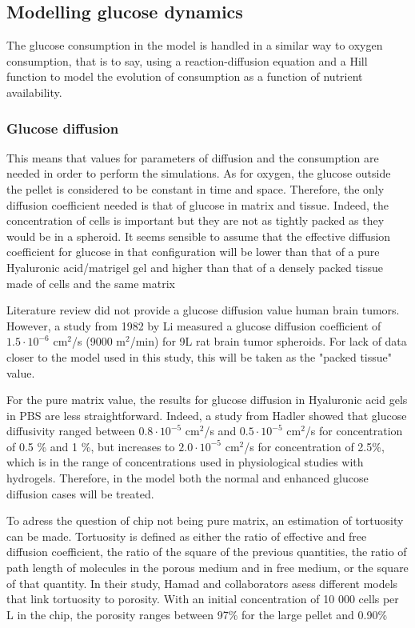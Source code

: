 \documentclass[11pt,a4paper]{article}
\begin{document}
\subsection{Modelling glucose dynamics}
The glucose consumption in the model is handled in a similar way to oxygen consumption, that is to say, using a reaction-diffusion equation and a Hill  function to model the evolution of consumption as a function of nutrient availability.

\subsubsection{Glucose diffusion}
This means that values for parameters of diffusion and the consumption are needed in order to perform the simulations. As for oxygen, the glucose outside the pellet is considered to be constant in time and space. Therefore, the only diffusion coefficient needed is that of glucose in matrix and tissue. Indeed, the concentration of cells is important but they are not as tightly packed as they would be in a spheroid. It seems sensible to assume that the effective diffusion coefficient for glucose in that configuration will be lower than that of a pure Hyaluronic acid/matrigel gel and higher than that of a densely packed tissue made of cells and the same matrix

Literature review did not provide a glucose diffusion value human brain tumors. However, a study from 1982  by Li measured a glucose diffusion coefficient of $1.5\cdot 10^{-6}$ cm$^2$/s (9000 \textmu m$^2$/min) for 9L rat brain tumor spheroids.\cite{Li1982} For lack of data closer to the model used in this study, this will be taken as the "packed tissue" value. 

For the pure matrix value, the results for glucose diffusion in Hyaluronic acid gels in PBS are less straightforward. Indeed, a study from Hadler showed that glucose diffusivity ranged between $0.8\cdot 10^{-5}$ cm$^2$/s and $0.5\cdot 10^{-5}$ cm$^2$/s for concentration of 0.5 \% and 1 \%, but increases to $2.0\cdot 10^{-5}$ cm$^2$/s for concentration of 2.5\%, which is in the range of concentrations used in physiological studies with hydrogels.\cite{Gerecht2007} Therefore, in the model both the normal and enhanced glucose diffusion cases will be treated.

To adress the question of chip not being pure matrix, an estimation of tortuosity can be made. Tortuosity is defined as either the ratio of effective and free diffusion coefficient, the ratio of the square of the previous quantities, the ratio of path length of molecules in the porous medium and in free medium, or the square of that quantity. In their study, Hamad and collaborators asess different models that link tortuosity to porosity.\cite{Hamad2018} With an initial concentration of 10 000 cells per \textmu L in the chip, the porosity ranges between 97\% for the large pellet and 0.90\% 
\end{document}
